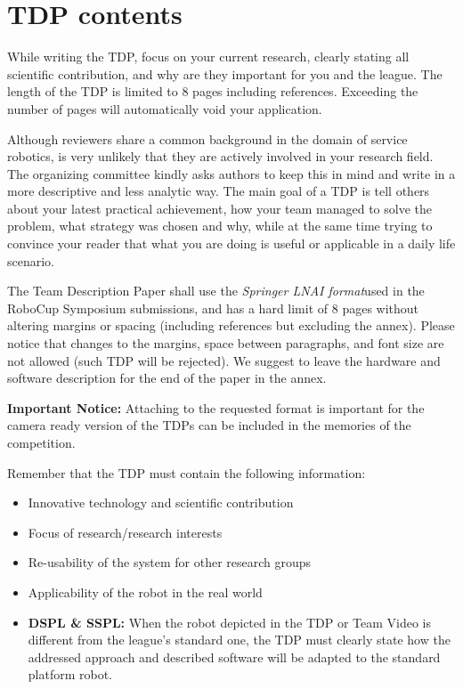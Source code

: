 \documentclass[runningheads,a4paper]{llncs}
\begin{document}
\section{TDP contents}
While writing the TDP, focus on your current research, clearly stating all scientific contribution, and why are they important for you and the league. The length of the TDP is limited to 8 pages including references. Exceeding the number of pages will automatically void your application.

Although reviewers share a common background in the domain of service robotics, is very unlikely that they are actively involved in your research field. The organizing committee kindly asks authors to keep this in mind and write in a more descriptive and less analytic way. The main goal of a TDP is tell others about your latest practical achievement, how your team managed to solve the problem, what strategy was chosen and why, while at the same time trying to convince your reader that what you are doing is useful or applicable in a daily life scenario.

The Team Description Paper shall use the \textit{Springer LNAI format}\footnotemark used in the RoboCup Symposium submissions, and has a hard limit of 8 pages without altering margins or spacing (including references but excluding the annex). Please notice that changes to the margins, space between paragraphs, and font size are not allowed (such TDP will be rejected). We suggest to leave the hardware and software description for the end of the paper in the annex.

\textbf{Important Notice:} Attaching to the requested format is important for the camera ready version of the TDPs can be included in the memories of the competition.

Remember that the TDP must contain the following information:

\begin{itemize}
	\item Innovative technology and scientific contribution
	\item Focus of research/research interests
	\item Re-usability of the system for other research groups
	\item Applicability of the robot in the real world
	\item \textbf{DSPL \& SSPL:} When the robot depicted in the TDP or Team Video is different from the league's standard one, the TDP must clearly state how the addressed approach and described software will be adapted to the standard platform robot.
\end{itemize}
\end{document}
